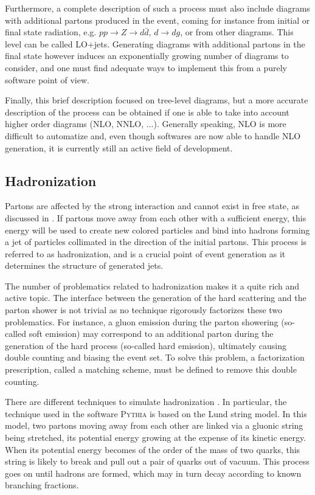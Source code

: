     Furthermore, a complete description of such a process must also include
    diagrams with additional partons produced in the event, coming for instance
    from initial or final state radiation, e.g. $pp \rightarrow Z \rightarrow
    d\bar{d}$, $d\rightarrow dg$, or from other diagrams. This level can be called
    LO+jets. Generating diagrams with additional partons in the final state however
    induces an exponentially growing number of diagrams to consider, and one must
    find adequate ways to implement this from a purely software point of view.

    Finally, this brief description focused on tree-level diagrams, but a more accurate
    description of the process can be obtained if one is able to take into account higher order
    diagrams (NLO, NNLO, ...). Generally speaking, NLO is more difficult to
    automatize and, even though softwares are now able to handle NLO generation, it is
    currently still an active field of development.

    \subsection{Hadronization}

    Partons are affected by the strong interaction and cannot exist in free state,
    as discussed in . If partons move away from
    each other with a sufficient energy, this energy will be used to create new colored
    particles and bind into hadrons forming a jet of particles collimated in the
    direction of the initial partons. This process is referred to as hadronization,
    and is a crucial point of event generation as it determines the structure
    of generated jets.

    The number of problematics related to hadronization makes it a quite rich and
    active topic. The interface between the generation of the hard scattering
    and the parton shower is not trivial as no technique rigorously factorizes
    these two problematics. For instance, a gluon emission during
    the parton showering (so-called soft emission) may correspond to an additional
    parton during the generation of the hard process (so-called hard emission),
    ultimately causing double counting and biasing the event set. To solve this
    problem, a factorization prescription, called a matching scheme, must be defined
    to remove this double counting.

    There are different techniques to simulate hadronization \cite{MCGenPDG}. In particular, the
    technique used in the software \textsc{Pythia} is based on the Lund string
    model. In this model, two partons moving away from each other are linked
    via a gluonic string being stretched, its potential energy growing at
    the expense of its kinetic energy. When its potential energy becomes of the
    order of the mass of two quarks, this string is likely to break and pull
    out a pair of quarks out of vacuum. This process goes on until
    hadrons are formed, which may in turn decay according to known branching
    fractions.

